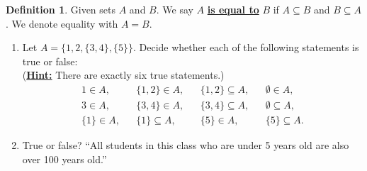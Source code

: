 \documentclass[11pt]{article}
\newenvironment{task}
	{\begin{mdframed}[linecolor=lightgray, linewidth=3pt]\raggedright}
	{\end{mdframed}}
\renewcommand\subset\subseteq
\renewcommand\emph[1]{\underline{\bf{#1}}} %
\theoremstyle{definition}
\newtheorem{definition}[theorem]{Definition}
\begin{document}
\begin{definition}\label{definition: set equality}
Given sets $A$ and $B$. We say $A$ \emph{is equal to} $B$ if $A\subset B$ and $B\subset A$. We denote equality with $A=B$.
\end{definition}


\begin{task}
\begin{enumerate}
\item Let $A = \{1,2,\{3,4\}, \{5\}\}$.  
Decide whether each of the following statements is true or false: \\
	(\emph{Hint:} There are exactly six true statements.)
		\begin{align*}
			1 \in A,  && \{1, 2\} \in A, && \{1, 2\} \subseteq A, && \emptyset \in A,\\
			3 \in A,  && \{3, 4\} \in A, && \{3, 4\} \subseteq A, && \emptyset \subseteq  A,\\
			\{1\} \in A, && \{1\} \subseteq A, && \{5\} \in A, && \{5\} \subseteq A.
		\end{align*}


\item True or false? ``All students in this class who are under 5 years old are also over 100 years old.''
\end{enumerate}
\end{task}
\end{document}

